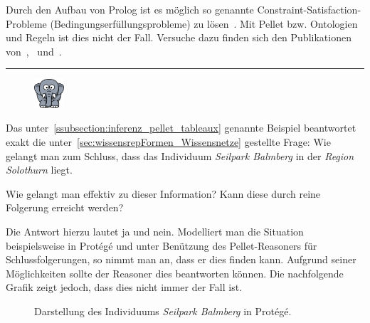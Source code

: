 Durch den Aufbau von Prolog ist es möglich so genannte Constraint-Satisfaction-Probleme (Bedingungserfüllungsprobleme) zu lösen~\citep[Details siehe][S. 148]{laemmel}. Mit Pellet bzw. Ontologien und Regeln ist dies nicht der Fall. Versuche dazu finden sich den Publikationen von~\citet{xiong2008constraint},~\citet{staab2006constraint} und~\citet{bramer2007constraint}.

\noindent\rule[1ex]{\textwidth}{1pt}
\begin{figure}
    \vspace{-12pt}
    \includegraphics[width=0.1\textwidth]{bilder/elephant.png}
\end{figure}
Das unter~\ref{ssubsection:inferenz_pellet_tableaux} genannte Beispiel beantwortet exakt die unter~\ref{sec:wissensrepFormen_Wissensnetze} gestellte Frage: Wie gelangt man zum Schluss, dass das Individuum \textit{Seilpark Balmberg} in der \textit{Region} \textit{Solothurn} liegt.

Wie gelangt man effektiv zu dieser Information? Kann diese durch reine Folgerung erreicht werden?

Die Antwort hierzu lautet ja und nein. Modelliert man die Situation beispielsweise in Protégé und unter Benützung des Pellet-Reasoners für Schlussfolgerungen, so nimmt man an, dass er dies finden kann. Aufgrund seiner Möglichkeiten sollte der Reasoner dies beantworten können. Die nachfolgende Grafik zeigt jedoch, dass dies nicht immer der Fall ist.

\begin{figure}[H]
\centering {}
\caption{Darstellung des Individuums \textit{Seilpark Balmberg} in Protégé.\label{fig:inferenz_protege}\protect\footnotemark}
\end{figure}

